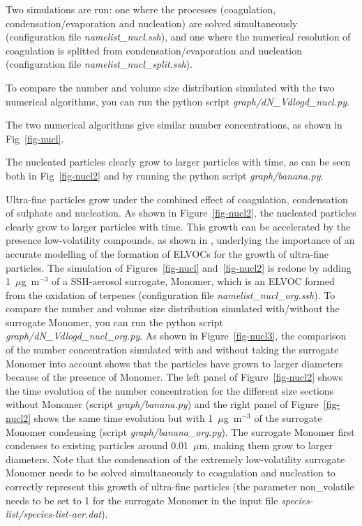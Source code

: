 \documentclass[a4paper,11pt]{article}
\begin{document}
Two simulations are run: one where the processes (coagulation,
condensation/evaporation and nucleation) are solved simultaneously
(configuration file {\it{namelist\_nucl.ssh}}), and one where the numerical
resolution of coagulation is splitted from condensation/evaporation and
nucleation (configuration file {\it{namelist\_nucl\_split.ssh}}). 

To compare the number and volume size distribution simulated with the two numerical algorithms, you can run the python script {\it{graph/dN\_Vdlogd\_nucl.py}}.

The two numerical algorithms give similar number concentrations, as shown in Fig~\ref{fig-nucl}.

The nucleated particles clearly grow to larger particles with time, as can be seen both in Fig~\ref{fig-nucl2} and by running the python script {\it{graph/banana.py}}.

Ultra-fine particles grow under the combined effect of coagulation,
condensation of sulphate and nucleation. 
As shown in Figure~\ref{fig-nucl2}, the nucleated particles clearly grow to larger particles with time.
This growth can be accelerated by the presence low-volatility compounds, as shown in \cite{pat18}, underlying the importance of an accurate modelling of the formation of ELVOCs for the growth of ultra-fine particles. 
The simulation of Figures~\ref{fig-nucl} and~\ref{fig-nucl2} is redone by adding 1~$\mu$g~m$^{-3}$ of a SSH-aerosol surrogate, Monomer, which is an ELVOC formed from the oxidation of terpenes (configuration file {\it{namelist\_nucl\_org.ssh}}).
To compare the number and volume size distribution simulated with/without the surrogate Monomer, you can run the python script {\it{graph/dN\_Vdlogd\_nucl\_org.py}}.
As shown in Figure~\ref{fig-nucl3}, the comparison of the number concentration simulated with and without taking the surrogate Monomer into account shows that 
the particles have grown to larger diameters because of the presence of Monomer. 
The left panel of Figure~\ref{fig-nucl2} shows the time evolution of the number concentration for the different size sections without Monomer (script {\it{graph/banana.py}}) and 
the right panel of Figure~\ref{fig-nucl2} shows the same time evolution but with 1~$\mu$g~m$^{-3}$ of the surrogate Monomer condensing (script {\it{graph/banana\_org.py}}). 
The surrogate Monomer first condenses to existing particles around 0.01~$\mu$m, making them grow to larger diameters.
Note that the condensation of the extremely low-volatility surrogate Monomer needs to be solved simultaneously to coagulation and nucleation to correctly represent this growth of ultra-fine particles (the parameter non\_volatile needs to be set to 1 for the surrogate Monomer in the input file {\it{species-list/species-list-aer.dat}}).
\end{document}
